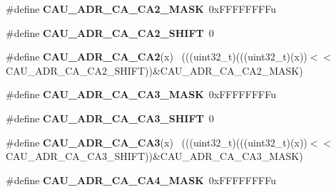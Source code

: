 \begin{DoxyCompactItemize}
\item 
\hypertarget{group___c_a_u___register___masks_ga9294c3d57841472174044b71a5a271ad}{}\#define {\bfseries C\+A\+U\+\_\+\+A\+D\+R\+\_\+\+C\+A\+\_\+\+C\+A2\+\_\+\+M\+A\+S\+K}~0x\+F\+F\+F\+F\+F\+F\+F\+Fu\label{group___c_a_u___register___masks_ga9294c3d57841472174044b71a5a271ad}

\item 
\hypertarget{group___c_a_u___register___masks_ga3809e21df053cc0fffe5518686527b59}{}\#define {\bfseries C\+A\+U\+\_\+\+A\+D\+R\+\_\+\+C\+A\+\_\+\+C\+A2\+\_\+\+S\+H\+I\+F\+T}~0\label{group___c_a_u___register___masks_ga3809e21df053cc0fffe5518686527b59}

\item 
\hypertarget{group___c_a_u___register___masks_gad20949d01c717aab0e68d3f014521ced}{}\#define {\bfseries C\+A\+U\+\_\+\+A\+D\+R\+\_\+\+C\+A\+\_\+\+C\+A2}(x)                                            ~(((uint32\+\_\+t)(((uint32\+\_\+t)(x))$<$$<$C\+A\+U\+\_\+\+A\+D\+R\+\_\+\+C\+A\+\_\+\+C\+A2\+\_\+\+S\+H\+I\+F\+T))\&C\+A\+U\+\_\+\+A\+D\+R\+\_\+\+C\+A\+\_\+\+C\+A2\+\_\+\+M\+A\+S\+K)\label{group___c_a_u___register___masks_gad20949d01c717aab0e68d3f014521ced}

\item 
\hypertarget{group___c_a_u___register___masks_ga32fe7c3ce489038db5a7614ff6c376d2}{}\#define {\bfseries C\+A\+U\+\_\+\+A\+D\+R\+\_\+\+C\+A\+\_\+\+C\+A3\+\_\+\+M\+A\+S\+K}~0x\+F\+F\+F\+F\+F\+F\+F\+Fu\label{group___c_a_u___register___masks_ga32fe7c3ce489038db5a7614ff6c376d2}

\item 
\hypertarget{group___c_a_u___register___masks_ga93cb8cfd1a5fb49e223ca89c7c821ab5}{}\#define {\bfseries C\+A\+U\+\_\+\+A\+D\+R\+\_\+\+C\+A\+\_\+\+C\+A3\+\_\+\+S\+H\+I\+F\+T}~0\label{group___c_a_u___register___masks_ga93cb8cfd1a5fb49e223ca89c7c821ab5}

\item 
\hypertarget{group___c_a_u___register___masks_gad6196b02149d256480a1c0f2faa3ee04}{}\#define {\bfseries C\+A\+U\+\_\+\+A\+D\+R\+\_\+\+C\+A\+\_\+\+C\+A3}(x)                                            ~(((uint32\+\_\+t)(((uint32\+\_\+t)(x))$<$$<$C\+A\+U\+\_\+\+A\+D\+R\+\_\+\+C\+A\+\_\+\+C\+A3\+\_\+\+S\+H\+I\+F\+T))\&C\+A\+U\+\_\+\+A\+D\+R\+\_\+\+C\+A\+\_\+\+C\+A3\+\_\+\+M\+A\+S\+K)\label{group___c_a_u___register___masks_gad6196b02149d256480a1c0f2faa3ee04}

\item 
\hypertarget{group___c_a_u___register___masks_ga2ed9f31c68a09dba5db3b3e10836f3e6}{}\#define {\bfseries C\+A\+U\+\_\+\+A\+D\+R\+\_\+\+C\+A\+\_\+\+C\+A4\+\_\+\+M\+A\+S\+K}~0x\+F\+F\+F\+F\+F\+F\+F\+Fu\label{group___c_a_u___register___masks_ga2ed9f31c68a09dba5db3b3e10836f3e6}


\end{DoxyCompactItemize}
